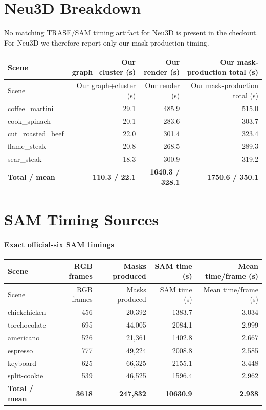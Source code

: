 \documentclass[10pt]{article}
\begin{document}
\section{Neu3D Breakdown}
No matching TRASE/SAM timing artifact for Neu3D is present in the checkout.  For Neu3D we therefore report only our mask-production timing.

\small
\begin{longtable}{lrrr}
\toprule
Scene & Our graph+cluster (s) & Our render (s) & Our mask-production total (s) \\
\midrule
\endfirsthead
\toprule
Scene & Our graph+cluster (s) & Our render (s) & Our mask-production total (s) \\
\midrule
\endhead
coffee\_martini & 29.1 & 485.9 & 515.0 \\
cook\_spinach & 20.1 & 283.6 & 303.7 \\
cut\_roasted\_beef & 22.0 & 301.4 & 323.4 \\
flame\_steak & 20.8 & 268.5 & 289.3 \\
sear\_steak & 18.3 & 300.9 & 319.2 \\
\midrule
\textbf{Total / mean} & \textbf{110.3 / 22.1} & \textbf{1640.3 / 328.1} & \textbf{1750.6 / 350.1} \\
\bottomrule
\end{longtable}
\normalsize

\section{SAM Timing Sources}
\paragraph{Exact official-six SAM timings}
\small
\begin{longtable}{lrrrr}
\toprule
Scene & RGB frames & Masks produced & SAM time (s) & Mean time/frame (s) \\
\midrule
\endfirsthead
\toprule
Scene & RGB frames & Masks produced & SAM time (s) & Mean time/frame (s) \\
\midrule
\endhead
chickchicken & 456 & 20,392 & 1383.7 & 3.034 \\
torchocolate & 695 & 44,005 & 2084.1 & 2.999 \\
americano & 526 & 21,361 & 1402.8 & 2.667 \\
espresso & 777 & 49,224 & 2008.8 & 2.585 \\
keyboard & 625 & 66,325 & 2155.1 & 3.448 \\
split-cookie & 539 & 46,525 & 1596.4 & 2.962 \\
\midrule
\textbf{Total / mean} & \textbf{3618} & \textbf{247,832} & \textbf{10630.9} & \textbf{2.938} \\
\bottomrule
\end{longtable}
\normalsize
\end{document}
